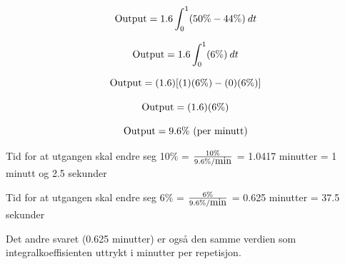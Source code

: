 $$\hbox{Output} = 1.6 \int_0^1 (50\% - 44\%) \> dt$$

$$\hbox{Output} = 1.6 \int_0^1 (6\%) \> dt$$

$$\hbox{Output} = (1.6) [(1)(6\%) - (0)(6\%)]$$

$$\hbox{Output} = (1.6) (6\%)$$

$$\hbox{Output} = 9.6\% \hbox{ (per minutt)}$$

\vskip 10pt

Tid for at utgangen skal endre seg 10\% = $10\% \over 9.6\%/\hbox{min}$ = 1.0417 minutter = 1 minutt og 2.5 sekunder

\vskip 10pt

Tid for at utgangen skal endre seg 6\% = $6\% \over 9.6\%/\hbox{min}$ = 0.625 minutter = 37.5 sekunder

\vskip 10pt

Det andre svaret (0.625 minutter) er også den samme verdien som integralkoeffisienten uttrykt i minutter per repetisjon.


